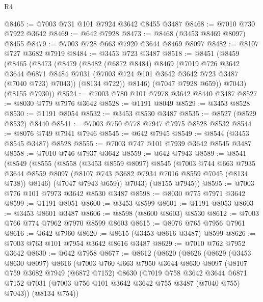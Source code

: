 \begin{lexlean}{R4}
\begin{coremodule}
@8465 := @7003 @731 @101 @7924 @3642 @8455 @3487
@8468 := @7010 @730 @7922 @3642
@8469 := @642 @7928
@8473 := @8468 (@3453 @8469 @8097) @8455
@8479 := @7003 @728 @663 @7920 @3644 @8469 @8097
@8482 := @8107 @727 @3682 @7919
@8484 := @3453 @723 @3487
@8518 := @8451
    (@8459
      (@8465
        (@8473
          (@8479
            (@8482
              (@6872 @8484)
              @8469
              (@7019
                @726
                @3642
                @3644
                @6871
                @8484
                @7031
                (@7003 @724 @101 @3642 @3642 @723 @3487 (@7040 @723) @7043))
              (@8134 @722))
            @8146)
          (@7047 @7928 @659))
        @7043)
      (@8155 @7930))
@8524 := @7003 @780 @101 @7978 @3642 @8440 @3487
@8527 := @8030 @779 @7976 @3642
@8528 := @1191 @8049
@8529 := @3453 @8528
@8530 := @1191 @8054
@8532 := @3453 @8530 @3487
@8535 := @8527 (@8529 @8532) @8440
@8541 := @7003 @750 @778 @7947 @7975 @8528 @8532
@8544 := @8076 @749 @7941 @7946
@8545 := @642 @7945
@8549 := @8544 (@3453 @8545 @3487) @8528
@8555 := @7003 @747 @101 @7939 @3642 @8545 @3487
@8558 := @7010 @746 @7937 @3642
@8559 := @642 @7943
@8589 := @8541
    (@8549
      (@8555
        (@8558
          (@3453 @8559 @8097)
          @8545
          (@7003
            @744
            @663
            @7935
            @3644
            @8559
            @8097
            (@8107 @743 @3682 @7934 @7016 @8559 @7045 (@8134 @738))
            @8146)
          (@7047 @7943 @659))
        @7043)
      (@8155 @7945))
@8595 := @7003 @776 @101 @7973 @3642 @8530 @3487
@8598 := @8030 @775 @7971 @3642
@8599 := @1191 @8051
@8600 := @3453 @8599
@8601 := @1191 @8053
@8603 := @3453 @8601 @3487
@8606 := @8598 (@8600 @8603) @8530
@8612 := @7003 @766 @774 @7962 @7970 @8599 @8603
@8615 := @8076 @765 @7956 @7961
@8616 := @642 @7960
@8620 := @8615 (@3453 @8616 @3487) @8599
@8626 := @7003 @763 @101 @7954 @3642 @8616 @3487
@8629 := @7010 @762 @7952 @3642
@8630 := @642 @7958
@8677 := @8612
    (@8620
      (@8626
        (@8629
          (@3453 @8630 @8097)
          @8616
          (@7003
            @760
            @663
            @7950
            @3644
            @8630
            @8097
            (@8107
              @759
              @3682
              @7949
              (@6872 @7152)
              @8630
              (@7019
                @758
                @3642
                @3644
                @6871
                @7152
                @7031
                (@7003 @756 @101 @3642 @3642 @755 @3487 (@7040 @755) @7043))
              (@8134 @754))

\end{coremodule}
\end{lexlean}
